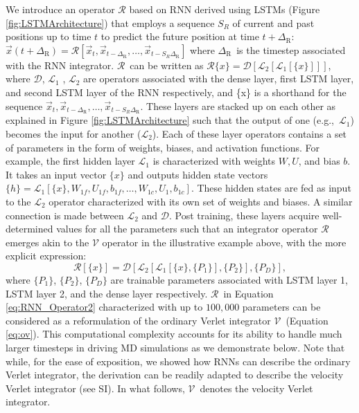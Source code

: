 \documentclass[aps,prl,twocolumn,superscriptaddress,tightenlines,longbibliography, reprint]{revtex4-1}
\newcommand{\eg}{e.g.,}
\newcommand{\dtR}{$\Delta_{\textrm{R}}$}
\newcommand{\R}{$\mathscr{R}$}
\newcommand{\V}{$\mathscr{V}$}
\begin{document}
We introduce an operator $\mathscr{R}$ based on RNN derived using LSTMs (Figure \ref{fig:LSTMArchitecture}) that employs a sequence $S_R$ of current and past positions up to time $t$ to predict the future position
at time $t+$\dtR: $\vec{x}(t+\Delta_{\textrm{R}}) = \mathscr{R}\left[\vec{x}_t, \vec{x}_{t -\Delta_{\textrm{R}}}, \ldots, \vec{x}_{t - S_R\Delta_{\textrm{R}}}\right]$
where \dtR\ is the timestep associated with the RNN integrator. 
\R\ can be written as $\mathscr{R} \{x\}= \mathscr{D} [ \mathscr{L}_2 [ \mathscr{L}_1 [ \{x\} ] ] ]$,
where $\mathscr{D}$, $\mathscr{L}_1$ , $\mathscr{L}_2$ are operators associated with the dense layer, first LSTM layer, and second LSTM layer of the RNN respectively, and \{x\} is a shorthand for the sequence $\vec{x}_t, \vec{x}_{t -\Delta_{\textrm{R}}}, \ldots, \vec{x}_{t - S_R\Delta_{\textrm{R}}}$. These layers are stacked up on each other as explained in Figure \ref{fig:LSTMArchitecture} such that the output of one (\eg\ $\mathscr{L}_1$) becomes the input for another ($\mathscr{L}_2$). Each of these layer operators contains a set of parameters in the form of weights, biases, and activation functions. For example, the first hidden layer $\mathscr{L}_1$ is characterized with weights $W, U$, and bias $b$. It takes an input vector $\{x\}$ and outputs hidden state vectors $\{h\} = \mathscr{L}_1 [\{x\}, W_{1f}, U_{1f}, b_{1f}, \ldots , W_{1c}, U_{1}, b_{1c}]$.
These hidden states are fed as input to the $\mathscr{L}_2$ operator characterized with its own set of weights and biases. A similar connection is made between $\mathscr{L}_2$ and $\mathscr{D}$. Post training, these layers acquire well-determined values for all the parameters such that an integrator operator $\mathscr{R}$ emerges akin to the $\mathcal{V}$ operator in the illustrative example above, with the more explicit expression:
\begin{equation}  \label{eq:RNN_Operator2}
    \mathscr{R}[\{x\}] = \mathscr{D} [\mathscr{L}_2 [\mathscr{L}_1  [ \{x\}, \{P_1\}], \{P_2\}], \{P_D\} ],
\end{equation}
where $\{P_1\}$, $\{P_2\}$, $\{P_D\}$ are trainable parameters associated with LSTM layer 1, LSTM layer 2, and the dense layer respectively.
\R\ in Equation \ref{eq:RNN_Operator2} characterized with up to $100,000$ parameters can be considered as a reformulation of the ordinary Verlet integrator \V\ (Equation \ref{eq:ov}). This computational complexity accounts for its ability to handle much larger timesteps in driving MD simulations as we demonstrate below.
Note that while, for the ease of exposition, we showed how RNNs can describe the ordinary Verlet integrator, the derivation can be readily adapted to describe the velocity Verlet integrator (see SI). In what follows, \V\ denotes the velocity Verlet integrator.
\end{document}
